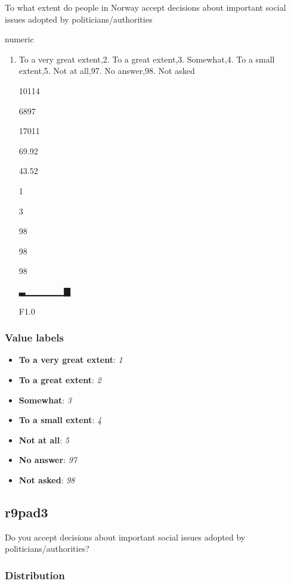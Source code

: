\documentclass[]{book}
\providecommand{\tightlist}{%
  \setlength{\itemsep}{0pt}\setlength{\parskip}{0pt}}
\begin{document}
To what extent do people in Norway accept decisions about important
social issues adopted by politicians/authorities

numeric

\begin{enumerate}
\def\labelenumi{\arabic{enumi}.}
\tightlist
\item
  To a very great extent,2. To a great extent,3. Somewhat,4. To a small
  extent,5. Not at all,97. No answer,98. Not asked

  10114

  6897

  17011

  69.92

  43.52

  1

  3

  98

  98

  98

  ▃▁▁▁▁▁▁▇

  F1.0
\end{enumerate}

\subsubsection{Value labels}\label{r9pad2_labels}

\begin{itemize}
\tightlist
\item
  \textbf{To a very great extent}: \emph{1}
\item
  \textbf{To a great extent}: \emph{2}
\item
  \textbf{Somewhat}: \emph{3}
\item
  \textbf{To a small extent}: \emph{4}
\item
  \textbf{Not at all}: \emph{5}
\item
  \textbf{No answer}: \emph{97}
\item
  \textbf{Not asked}: \emph{98}
\end{itemize}

\subsection{r9pad3}\label{r9pad3}

Do you accept decisions about important social issues adopted by
politicians/authorities?

\subsubsection{Distribution}\label{r9pad3_distribution}
\end{document}
